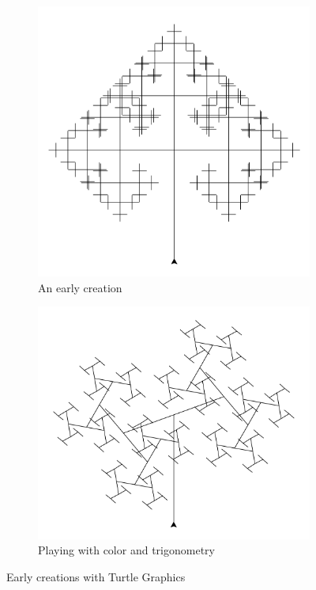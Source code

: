 \documentclass[12pt,twoside]{reedthesis}
\begin{document}
	\begin{figure}[h]
	\centering
	\begin{subfigure}{0.5\linewidth}
		\centering
		\includegraphics[width=0.8\linewidth]{Images/OldTurtle1}
		\caption{An early creation}
		\label{ThreeHollowRects}
	\end{subfigure}%
	\hfill
	\begin{subfigure}{0.5\linewidth}
		\centering
		\includegraphics[width=0.8\linewidth]{Images/OldTurtle2}
		\caption{Playing with color and trigonometry}
		\label{3dSine}
	\end{subfigure}
	\caption{Early creations with Turtle Graphics}
	\label{oldTurtle}
	\end{figure}
	
\end{document}
